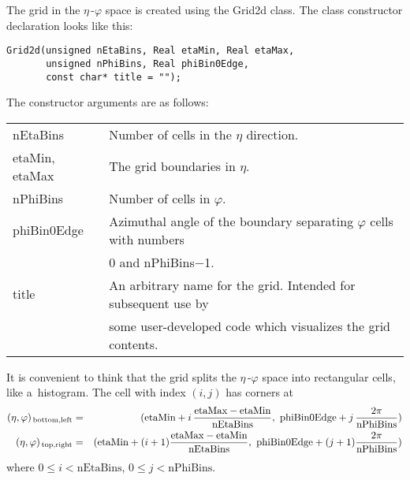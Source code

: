 \documentclass[epsf,12pt,titlepage]{article}
\newcommand{\sub}[1]{\ensuremath{_{\mbox{\scriptsize \,#1}}}}
\def\epspace {$\eta$\,-$\varphi$ space }
\newcommand{\cname}[1]{\index{#1}\textsf{#1}}
\begin{document}
The grid in the \epspace is created
using the \cname{Grid2d} class. The class constructor
declaration looks like this:
\begin{verbatim}
Grid2d(unsigned nEtaBins, Real etaMin, Real etaMax,
       unsigned nPhiBins, Real phiBin0Edge,
       const char* title = "");
\end{verbatim}
The constructor arguments are as follows:
\vskip2mm

\noindent \begin{tabular}{ll}
nEtaBins & Number of cells in the $\eta$ direction. \\
etaMin, etaMax & The grid boundaries in $\eta$. \\
nPhiBins & Number of cells in $\varphi$. \\
phiBin0Edge & Azimuthal angle of the boundary separating $\varphi$ cells with numbers \\
            & 0 and nPhiBins$-$1. \\
title & An arbitrary name for the grid. Intended for subsequent use by \\
      & some user-developed code which visualizes the grid contents. \\
\end{tabular}

\vskip2mm
\noindent It is convenient to think that the grid splits the \epspace
into rectangular cells, like a~histogram. The cell with index $(i,j)$ has corners at
\begin{eqnarray*}
(\eta, \varphi)\sub{bottom,left} & = & (\mbox{etaMin} + i\, \frac{\mbox{etaMax} - \mbox{etaMin}}{\mbox{nEtaBins}}, \ \mbox{phiBin0Edge} + j\, \frac{2 \pi}{\mbox{nPhiBins}})\\
(\eta, \varphi)\sub{top,right} & = & (\mbox{etaMin} + (i+1) \frac{\mbox{etaMax} - \mbox{etaMin}}{\mbox{nEtaBins}}, \ \mbox{phiBin0Edge} + (j+1) \frac{2 \pi}{\mbox{nPhiBins}})
\end{eqnarray*}
where $0 \le i < \mbox{nEtaBins}$, $0 \le j < \mbox{nPhiBins}$.
\end{document}
